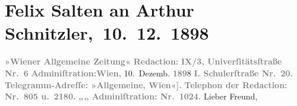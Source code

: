 

         
         \renewcommand{\erwaehntePersonen}{Personen: Felix Salten, Julius Szeps}
         \renewcommand{\erwaehnteInstitutionen}{Institutionen: Wiener Allgemeine Zeitung}
         \renewcommand{\erwaehnteOrte}{Orte: Paris, Schulerstraße, Universitätsstraße, Wien}
         \renewcommand{\erwaehnteWerke}{}
               \section[ Felix Salten an Arthur Schnitzler, 10. 12. 1898]{ Felix Salten an Arthur Schnitzler, 10. 12. 1898}\nopagebreak{}\rehead{ }\begin{ledgroupsized}[t]{13cm}\normalsize\beginnumbering{} \toendnotes[C]{\smallbreak\pagebreak[2]} 
\pstart
           \noindent{}{\pb}\textcolor{gray}{\textbf{\textbf{»Wiener Allgemeine
                        Zeitung«}}}\pend
           \pstart
           \textcolor{gray}{\textbf{Redaction:}}\pend
           \pstart
           \textcolor{gray}{\textbf{\textbf{IX/3, Univerſitätsſtraße Nr. 6}}}\pend
           \pstart
           \textcolor{gray}{\textbf{Adminiſtration:}}\hfill \textcolor{gray}{\textbf{Wien,}}{ }10. Dezemb. \textcolor{gray}{\textbf{189}}8\pend
           \pstart
           \textcolor{gray}{\textbf{\textbf{I. Schulerſtraße Nr. 20.}}}\pend
           \pstart
           \textcolor{gray}{\textbf{Telegramm-Adreſſe: »Allgemeine, Wien\oindex{Wien@\textbf{Wien}|pw}{[}«{]}.}}\pend
           \pstart
           \textcolor{gray}{\textbf{Telephon der Redaction: Nr. 805 u. 2180.}}\pend
           \pstart
           \textcolor{gray}{\textbf{\hspace*{1.5em}„\hspace*{1.5em}„\hspace*{1.5em} Adminiſtration: Nr. 1024.}}\pend
           \pstart{}Lieber Freund,\pend\pstart

\end{ledgroupsized}
